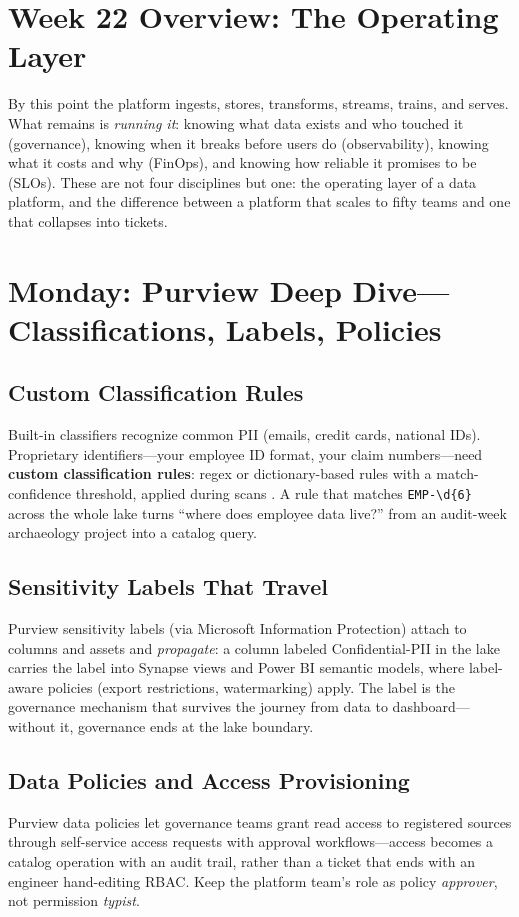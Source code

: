 \section{Week 22 Overview: The Operating Layer}
By this point the platform ingests, stores, transforms, streams, trains, and serves. What remains is \emph{running it}: knowing what data exists and who touched it (governance), knowing when it breaks before users do (observability), knowing what it costs and why (FinOps), and knowing how reliable it promises to be (SLOs). These are not four disciplines but one: the operating layer of a data platform, and the difference between a platform that scales to fifty teams and one that collapses into tickets.

\section{Monday: Purview Deep Dive---Classifications, Labels, Policies}

\subsection{Custom Classification Rules}
Built-in classifiers recognize common PII (emails, credit cards, national IDs). Proprietary identifiers---your employee ID format, your claim numbers---need \textbf{custom classification rules}: regex or dictionary-based rules with a match-confidence threshold, applied during scans \cite{microsoft2025purview}. A rule that matches \texttt{EMP-\textbackslash d\{6\}} across the whole lake turns ``where does employee data live?'' from an audit-week archaeology project into a catalog query.

\subsection{Sensitivity Labels That Travel}
Purview sensitivity labels (via Microsoft Information Protection) attach to columns and assets and \emph{propagate}: a column labeled Confidential-PII in the lake carries the label into Synapse views and Power BI semantic models, where label-aware policies (export restrictions, watermarking) apply. The label is the governance mechanism that survives the journey from data to dashboard---without it, governance ends at the lake boundary.

\subsection{Data Policies and Access Provisioning}
Purview data policies let governance teams grant read access to registered sources through self-service access requests with approval workflows---access becomes a catalog operation with an audit trail, rather than a ticket that ends with an engineer hand-editing RBAC. Keep the platform team's role as policy \emph{approver}, not permission \emph{typist}.


